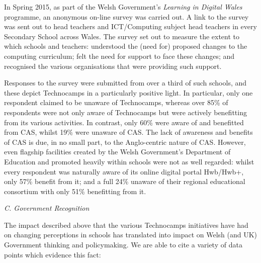 \documentclass[conference]{IEEEtran}
\begin{document}
In Spring 2015, as part of the Welsh Government's
\emph{Learning in Digital Wales} programme,
an anonymous on-line survey was carried out.
A link to the survey %
was sent out to head teachers and ICT/Computing subject head teachers
in every Secondary School across Wales.
The survey set out to measure the extent to which schools and teachers:
understood the (need for) proposed changes to the computing curriculum;
felt the need for support to face these changes;
and recognised the various organisations that were
providing such support.

Responses to the survey were submitted from over a third of such
schools, and these depict Technocamps in a particularly positive
light.  In particular, only one respondent claimed to be unaware of
Technocamps, whereas over 85\% of respondents were not only aware of
Technocamps but were actively benefitting from its various activities.
In contrast, only 60\% were aware of and benefitted from CAS, whilst
19\% were unaware of CAS. The lack of awareness and benefits of CAS is
due, in no small part, to the Anglo-centric nature of CAS.  However,
even flagship facilities created by the Welsh Government's Department
of Education and promoted heavily within schools were not as well
regarded: whilst every respondent was naturally aware of its online
digital portal Hwb/Hwb+, only 57\% benefit from it; and a full 24\%
unaware of their regional educational consortium with only 51\%
benefitting from it.

\noindent\textit{C. Government Recognition}

The impact described above that the various Technocamps initiatives
have had on changing perceptions in schools has translated into impact
on Welsh (and UK) Government thinking and policymaking.
We are able to cite a variety of data points
which evidence this fact:
\end{document}
